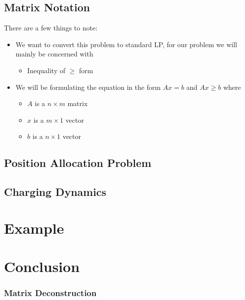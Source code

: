 \documentclass[letterpaper, 10pt, conference]{IEEEtran}
\begin{document}
\subsection{Matrix Notation}\label{matrix-notation}

There are a few things to note:

\begin{itemize}
\item
  We want to convert this problem to standard LP, for our problem we
  will mainly be concerned with

  \begin{itemize}
  \item
    Inequality of \(\geq\) form
  \end{itemize}
\item
  We will be formulating the equation in the form \(Ax = b\) and
  \(Ax \geq b\) where

  \begin{itemize}
  \item
    \(A\) is a \(n \times m\) matrix
  \item
    \(x\) is a \(m \times 1\) vector
  \item
    \(b\) is a \(n \times 1\) vector
  \end{itemize}
\end{itemize}


\subsection{Position Allocation Problem}
\subsection{Charging Dynamics}

\section{Example}

\section{Conclusion}

\subsubsection{Matrix Deconstruction}\label{matrix-deconstruction}
\end{document}
